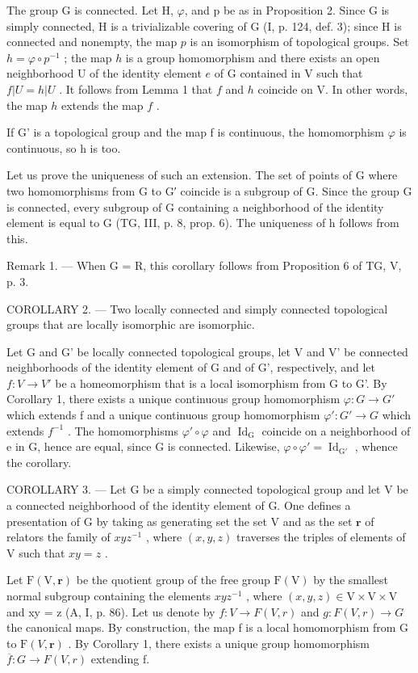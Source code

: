 The group G is connected. Let H, \(\varphi\), and p be as in Proposition 2. Since G is simply connected, H is a trivializable covering of G (I, p. 124, def. 3); since H is connected and nonempty, the map \(p\) is an isomorphism of topological groups. Set \(h = \varphi \circ p^{-1}\) ; the map \(h\) is a group homomorphism and there exists an open neighborhood U of the identity element \(e\) of G contained in V such that \(f|U = h|U\) . It follows from Lemma 1 that \(f\) and \(h\) coincide on V. In other words, the map \(h\) extends the map \(f\) .

If G' is a topological group and the map f is continuous, the homomorphism \(\varphi\) is continuous, so h is too.

Let us prove the uniqueness of such an extension. The set of points of G where two homomorphisms from G to G′ coincide is a subgroup of G. Since the group G is connected, every subgroup of G containing a neighborhood of the identity element is equal to G (TG, III, p. 8, prop. 6). The uniqueness of h follows from this.

Remark 1. --- When G = R, this corollary follows from Proposition 6 of TG, V, p. 3.

COROLLARY 2. --- Two locally connected and simply connected topological groups that are locally isomorphic are isomorphic.

Let G and G' be locally connected topological groups, let V and V' be connected neighborhoods of the identity element of G and of G', respectively, and let \(f: V \to V'\) be a homeomorphism that is a local isomorphism from G to G'. By Corollary 1, there exists a unique continuous group homomorphism \(\varphi: G \to G'\) which extends f and a unique continuous group homomorphism \(\varphi': G' \to G\) which extends \(f^{-1}\) . The homomorphisms \(\varphi' \circ \varphi\) and \(\operatorname{Id}_{\mathrm{G}}\) coincide on a neighborhood of e in G, hence are equal, since G is connected. Likewise, \(\varphi \circ \varphi' = \operatorname{Id}_{\mathrm{G}'}\) , whence the corollary.

COROLLARY 3. --- Let G be a simply connected topological group and let V be a connected neighborhood of the identity element of G. One defines a presentation of G by taking as generating set the set V and as the set \(\mathbf{r}\) of relators the family of \(xyz^{-1}\) , where \((x,y,z)\) traverses the triples of elements of V such that \(xy = z\) .

Let \(\mathrm{F}(\mathrm{V}, \mathbf{r})\) be the quotient group of the free group \(\mathrm{F}(\mathrm{V})\) by the smallest normal subgroup containing the elements \(xyz^{-1}\) , where \((x, y, z) \in \mathrm{V} \times \mathrm{V} \times \mathrm{V}\) and xy = z (A, I, p. 86). Let us denote by \(f: V \to F(V, r)\) and \(g: F(V, r) \to G\) the canonical maps. By construction, the map f is a local homomorphism from G to \(\mathrm{F}(V, \mathbf{r})\) . By Corollary 1, there exists a unique group homomorphism \(\overline{f}: G \to F(V, r)\) extending f.


